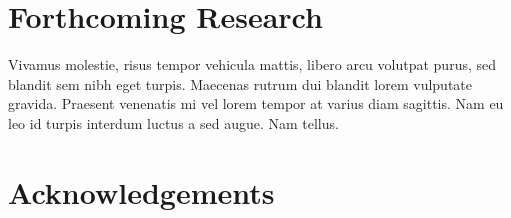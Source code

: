 \documentclass[a1,portrait]{a1poster}
\begin{document}
\begin{multicols}{2}
\color{Black} %


\section*{Forthcoming Research}

Vivamus molestie, risus tempor vehicula mattis, libero arcu volutpat purus, sed blandit sem nibh eget turpis. Maecenas rutrum dui blandit lorem vulputate gravida. Praesent venenatis mi vel lorem tempor at varius diam sagittis. Nam eu leo id turpis interdum luctus a sed augue. Nam tellus.



\begin{small}%
\begin{multicols}{2}%
\nocite{*} %
\end{multicols}
\end{small}

\section*{Acknowledgements}


\end{multicols}
\end{document}
